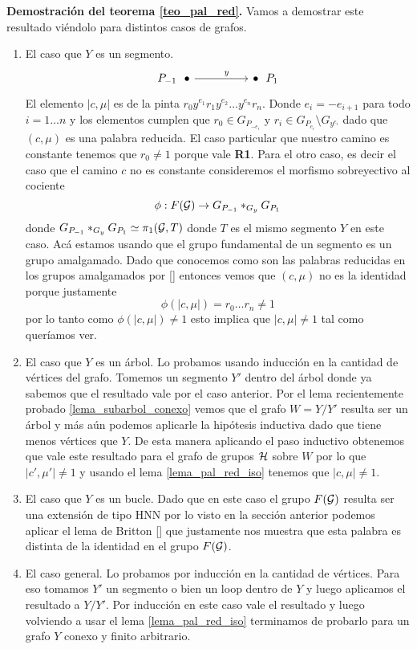 \documentclass[tesis.tex]{subfiles}
\newcommand{\cG}{ {\cal G} }
\newcommand{\cH}{ {\cal H} }
\begin{document}
\textbf{Demostración del teorema \ref{teo_pal_red}.}
Vamos a demostrar este resultado viéndolo para distintos casos de grafos.
	\begin{enumerate}
		\item El caso que $Y$ es un segmento.
		\[\begin{tikzcd}
			{P_{-1} \ \ \bullet} && {\bullet \ \ P_1}
			\arrow["y"{pos=0.6}, from=1-1, to=1-3]
		\end{tikzcd}\]
		El elemento $|c, \mu|$ es de la pinta $r_0y^{e_1}r_1y^{e_2}\dots y^{e_n}r_n$.
		Donde $e_{i} = -e_{i+1}$ para todo $i=1 \dots n$ y los elementos cumplen que $r_0 \in G_{P_{-e_i}}$ y $r_i \in G_{P_{e_i}} \setminus G_{y^{e_i}}$ dado que $(c, \mu)$ es una palabra reducida.
		El caso particular que nuestro camino es constante tenemos que $r_0 \neq 1$ porque vale \textbf{R1}.
		Para el otro caso, es decir el caso que el camino $c$ no es constante consideremos el morfismo sobreyectivo al cociente 
		\[
			\phi: F(\cG) \to G_{P_{-1}} \ast_{G_y} G_{P_1}
		\]
		donde $G_{P_{-1}} \ast_{G_y} G_{P_1} \simeq \pi_1(\cG, T)$ donde $T$ es el mismo segmento $Y$ en este caso. 
		Acá estamos usando que el grupo fundamental de un segmento es un grupo amalgamado.
		Dado que conocemos como son las palabras reducidas en los grupos amalgamados por \ref{} entonces vemos que $(c, \mu)$ no es la identidad porque justamente 
		\[
			\phi(|c,\mu|) = r_0 \dots r_n \neq 1
		\]
		por lo tanto como $\phi(|c,\mu|) \neq 1 $ esto implica que $|c,\mu| \neq 1$ tal como queríamos ver.
		
		\item El caso que $Y$ es un árbol. 
		Lo probamos usando inducción en la cantidad de vértices del grafo.
		Tomemos un segmento $Y'$ dentro del árbol donde ya sabemos que el resultado vale por el caso anterior.
		Por el lema recientemente probado \ref{lema_subarbol_conexo} vemos que el grafo $W = Y / Y'$ resulta ser un árbol y más aún podemos aplicarle la hipótesis inductiva dado que tiene menos vértices que $Y$. 
		De esta manera aplicando el paso inductivo obtenemos que vale este resultado para el grafo de grupos $\cH$ sobre $W$ por lo que $|c',\mu'| \neq 1$ y usando el lema \ref{lema_pal_red_iso} tenemos que $|c, \mu| \neq 1$.
		
		\item El caso que $Y$ es un bucle.
		Dado que en este caso el grupo $F(\cG)$ resulta ser una extensión de tipo HNN por lo visto en la sección anterior podemos aplicar el lema de Britton \ref{} que justamente nos muestra que esta palabra es distinta de la identidad en el grupo $F(\cG)$.
		
		\item El caso general.
		Lo probamos por inducción en la cantidad de vértices. 
		Para eso tomamos $Y'$ un segmento o bien un loop dentro de $Y$ y luego aplicamos el resultado a $Y/Y'$.
		Por inducción en este caso vale el resultado y luego volviendo a usar el lema \ref{lema_pal_red_iso} terminamos de probarlo para un grafo $Y$ conexo y finito arbitrario.
	\end{enumerate}
\end{document}

